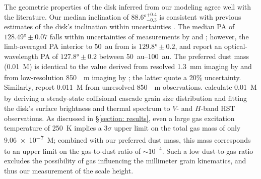 \documentclass[modern]{aastex62}
\begin{document}
The geometric properties of the disk inferred from our modeling agree well with the literature. 
Our median inclination of $\ang[angle-symbol-over-decimal]{88.6}^{+0.4}_{-0.3}$ is consistent with previous estimates of the disk's inclination within uncertainties \citep{metchev05,krist05}.
The median PA of $\ang[angle-symbol-over-decimal]{128.49} \pm 0.07$ falls within uncertainties of measurements by \cite{macgregor13} and \cite{krist05}; however, the limb-averaged PA interior to \SI{50}{au} from \cite{metchev05} is $\ang[angle-symbol-over-decimal]{129.8} \pm 0.2$, and \cite{schneider14} report an optical-wavelength PA of $\ang[angle-symbol-over-decimal]{127.8} \pm 0.2$ between \SIrange{50}{100}{au}.
The preferred dust mass (\SI{0.01}{M_\earth}) is identical to the value derived from resolved \SI{1.3}{mm} imaging by \cite{macgregor13} and from low-resolution \SI{850}{\mu m} imaging by \cite{matthews15}; the latter quote a 20\% uncertainty.
Similarly, \cite{liu04} report \SI{0.011}{M_\earth} from unresolved \SI{850}{\mu m} observations.
\cite{strubbe&chiang06} calculate \SI{0.01}{M_\earth} by deriving a steady-state collisional cascade grain size distribution and fitting the disk's surface brightness and thermal spectrum to $V$- and $H$-band HST observations.
As discussed in \S \ref{section: results}, even a large gas excitation temperature of \SI{250}{K} implies a $3 \sigma$ upper limit on the total gas mass of only \SI{9.06e-7}{M_\earth}; combined with our preferred dust mass, this mass corresponds to an upper limit on the gas-to-dust ratio of $\sim 10^{-4}$.
Such a low dust-to-gas ratio excludes the possibility of gas influencing the millimeter grain kinematics, and thus our measurement of the scale height.
\end{document}
